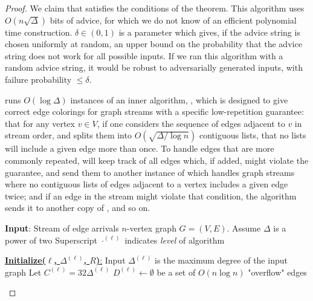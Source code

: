 \documentclass[10pt]{article}
\theoremstyle{definition}\newtheorem{definition}[lemma]{Definition}
\theoremstyle{remark}  \newtheorem*{remark}{Remark}
\newcommand{\pell}{{(\ell)}} %
\begin{document}
\begin{proof} We claim that  satisfies the conditions of the theorem. This algorithm uses $O(n \sqrt{\Delta})$ bits of advice, for which we do not know of an efficient polynomial time construction. $\delta \in (0,1)$ is a parameter which gives, if the advice string is chosen uniformly at random, an upper bound on the probability that the advice string does not work for all possible inputs. If we
ran this algorithm with a random advice string, it would be robust to adversarially generated inputs, with failure probability $\le \delta$.
  
   runs $O(\log \Delta)$ instances of an inner algorithm, , which is designed to give correct edge colorings
  for graph streams with a specific low-repetition guarantee: that for any vertex $v \in V$, if one considers the sequence of edges adjacent to $v$ in stream order,
  and splits them into $O(\sqrt{\Delta / \log n})$ contiguous lists, that no lists
  will include a given edge more than once. To handle edges that are more
  commonly repeated,  will keep track of all edges which,
  if added, might violate the guarantee, and send them to another instance of
   which handles graph streams where no contiguous lists
  of edges adjacent to a vertex includes a given edge twice; and if an edge
  in the stream might violate that condition, the algorithm sends it to another
  copy of , and so on.
  
  
  
  
  \begin{algorithm}[ht!]
    \caption{Inner algorithm:  $O(\Delta \log \Delta)$ edge coloring for graph edge arrival streams which have certain substreams satisfying Property Z, plus reference counting\label{alg:det-ea-inner}}
    \begin{algorithmic}[1]
    \Statex \textbf{Input}: Stream of edge arrivals $n$-vertex graph $G=(V,E)$. 
      \Statex Assume $\Delta$ is a power of two
      \Statex Superscript $\cdot^\pell$ indicates \emph{level} of algorithm
      
      \Statex
      \Statex \underline{\textbf{Initialize($\ell$, $\Delta^\pell$, $R$)}:}
        \Statex Input $\Delta^\pell$ is the maximum degree of the input graph
        \Statex Let $C^\pell = 32 \Delta^\pell$
        \State $D^\pell \gets \emptyset$ be a set of $O(n \log n)$ "overflow" edges %
        

\end{algorithmic}
\end{algorithm}
\end{proof}
\end{document}
